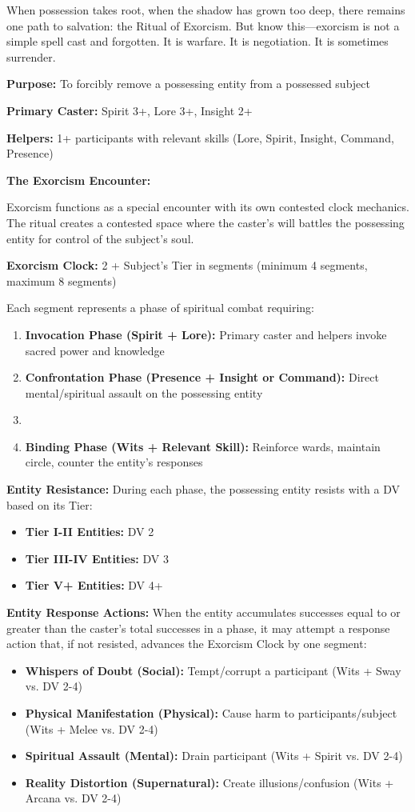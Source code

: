 When possession takes root, when the shadow has grown too deep, there remains one path to salvation: the Ritual of Exorcism. But know this—exorcism is not a simple spell cast and forgotten. It is warfare. It is negotiation. It is sometimes surrender.

\textbf{Purpose:} To forcibly remove a possessing entity from a possessed subject

\textbf{Primary Caster:} Spirit 3+, Lore 3+, Insight 2+

\textbf{Helpers:} 1+ participants with relevant skills (Lore, Spirit, Insight, Command, Presence)

\textbf{The Exorcism Encounter:}

Exorcism functions as a special encounter with its own contested clock mechanics. The ritual creates a contested space where the caster's will battles the possessing entity for control of the subject's soul.

\textbf{Exorcism Clock:} 2 + Subject's Tier in segments (minimum 4 segments, maximum 8 segments)

Each segment represents a phase of spiritual combat requiring:
\begin{enumerate}
\item \textbf{Invocation Phase (Spirit + Lore):} Primary caster and helpers invoke sacred power and knowledge
\item \textbf{Confrontation Phase (Presence + Insight or Command):} Direct mental/spiritual assault on the possessing entity
\item \item \textbf{Binding Phase (Wits + Relevant Skill):} Reinforce wards, maintain circle, counter the entity's responses
\end{enumerate}

\textbf{Entity Resistance:}
During each phase, the possessing entity resists with a DV based on its Tier:
\begin{itemize}
\item \textbf{Tier I-II Entities:} DV 2
\item \textbf{Tier III-IV Entities:} DV 3
\item \textbf{Tier V+ Entities:} DV 4+
\end{itemize}

\textbf{Entity Response Actions:}
When the entity accumulates successes equal to or greater than the caster's total successes in a phase, it may attempt a response action that, if not resisted, advances the Exorcism Clock by one segment:
\begin{itemize}
\item \textbf{Whispers of Doubt (Social):} Tempt/corrupt a participant (Wits + Sway vs. DV 2-4)
\item \textbf{Physical Manifestation (Physical):} Cause harm to participants/subject (Wits + Melee vs. DV 2-4)
\item \textbf{Spiritual Assault (Mental):} Drain participant (Wits + Spirit vs. DV 2-4)
\item \textbf{Reality Distortion (Supernatural):} Create illusions/confusion (Wits + Arcana vs. DV 2-4)
\end{itemize}

